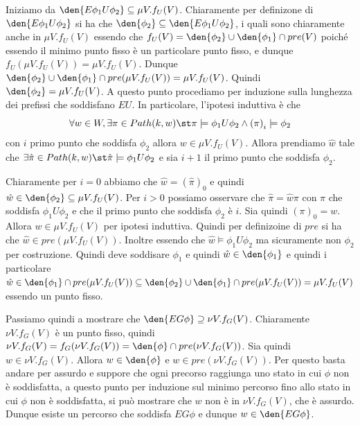 Iniziamo da \(\den{E \phi_1 U \phi_2} \subseteq \mu V . f_U(V)\). Chiaramente per definizone di \(\den{E \phi_1 U \phi_2}\) si ha che \(\den{\phi_2}\subseteq \den{E \phi_1 U \phi_2}\), i quali sono chiaramente anche in \(\mu V . f_U(V)\) essendo che
\(f_U (V) = \den{\phi_2} \cup \den{\phi_1}\cap pre(V) \) poiché essendo il minimo punto fisso è un particolare punto fisso, e dunque \(f_U(\mu V . f_U(V)) = \mu V . f_U(V)\). Dunque \(\den{\phi_2} \cup \den{\phi_1}\cap pre(\mu V . f_U(V)) = \mu V . f_U(V)\). Quindi  \(\den{\phi_2} = \mu V . f_U(V)\). A questo punto procediamo per induzione sulla lunghezza dei prefissi che soddisfano \(EU\). In particolare, l'ipotesi induttiva è che
\[\forall w \in W, \exists \pi \in Path(k,w)\st \pi\models \phi_1 U \phi_2 \land {(\pi)}_i \models \phi_2\]
con \(i\) primo punto che soddisfa \(\phi_2\) allora \(w \in \mu V. f_U(V)\). Allora prendiamo \(\hat{w}\) tale che \(\exists \hat{\pi} \in Path(k,w)\st \hat{\pi}\models \phi_1 U \phi_2\) e sia \(i+1\) il primo punto che soddisfa \(\phi_2\).

Chiaramente per \(i = 0\) abbiamo che \(\hat{w} = {(\hat{\pi})}_0\) e quindi \(\hat{w} \in \den{\phi_2} \subseteq \mu V . f_U(V)\). Per \(i > 0\) possiamo osservare che \(\hat{\pi} = \hat{w} \pi\) con \(\pi\) che soddisfa \(\phi_1 U \phi_2\) e che il primo punto che soddisfa \(\phi_2\) è \(i\). Sia quindi \({(\pi)}_0 = w\). Allora \(w \in \mu V . f_U(V)\) per ipotesi induttiva. Quindi per definizoine di \(pre\) si ha che \(\hat{w} \in pre(\mu V . f_U(V))\). Inoltre essendo che \(\hat{w} \models \phi_1 U \phi_2\) ma sicuramente non \(\phi_2\) per costruzione. Quindi deve soddisare \(\phi_1\) e quindi \(\hat{w}\in \den{\phi_1}\) e quindi i particolare \(\hat{w}\in \den{\phi_1}\cap pre(\mu V . f_U(V))\subseteq \den{\phi_2}\cup \den{\phi_1}\cap pre(\mu V . f_U(V)) = \mu V . f_U(V)\) essendo un punto fisso.

Passiamo quindi a mostrare che \(\den{EG \phi} \supseteq \nu V . f_G(V)\). Chiaramente \(\nu V . f_G(V)\) è un punto fisso, quindi \(\nu V . f_G(V) = f_G(\nu V . f_G(V)) = \den{\phi} \cap pre(\nu V . f_G(V))\). Sia quindi \(w \in \nu V . f_G(V)\). Allora \(w \in \den{\phi}\) e \(w \in pre(\nu V . f_G(V))\). Per questo basta andare per assurdo e suppore che ogni precorso raggiunga uno stato in cui \(\phi\) non è soddisfatta, a questo punto per induzione sul minimo percorso fino allo stato in cui \(\phi\) non è soddisfatta, si può mostrare che \(w\) non è in \(\nu V . f_G(V)\), che è assurdo. Dunque esiste un percorso che soddisfa \(EG \phi\) e dunque \(w \in \den{EG \phi}\).

